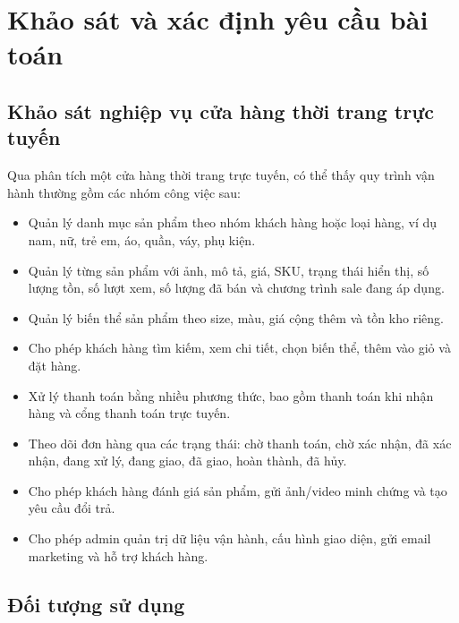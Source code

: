 \documentclass[12pt,a4paper]{report}
\begin{document}
\section{Khảo sát và xác định yêu cầu bài toán}

\subsection{Khảo sát nghiệp vụ cửa hàng thời trang trực tuyến}

Qua phân tích một cửa hàng thời trang trực tuyến, có thể thấy quy trình vận hành thường gồm các nhóm công việc sau:

\begin{itemize}
    \item Quản lý danh mục sản phẩm theo nhóm khách hàng hoặc loại hàng, ví dụ nam, nữ, trẻ em, áo, quần, váy, phụ kiện.
    \item Quản lý từng sản phẩm với ảnh, mô tả, giá, SKU, trạng thái hiển thị, số lượng tồn, số lượt xem, số lượng đã bán và chương trình sale đang áp dụng.
    \item Quản lý biến thể sản phẩm theo size, màu, giá cộng thêm và tồn kho riêng.
    \item Cho phép khách hàng tìm kiếm, xem chi tiết, chọn biến thể, thêm vào giỏ và đặt hàng.
    \item Xử lý thanh toán bằng nhiều phương thức, bao gồm thanh toán khi nhận hàng và cổng thanh toán trực tuyến.
    \item Theo dõi đơn hàng qua các trạng thái: chờ thanh toán, chờ xác nhận, đã xác nhận, đang xử lý, đang giao, đã giao, hoàn thành, đã hủy.
    \item Cho phép khách hàng đánh giá sản phẩm, gửi ảnh/video minh chứng và tạo yêu cầu đổi trả.
    \item Cho phép admin quản trị dữ liệu vận hành, cấu hình giao diện, gửi email marketing và hỗ trợ khách hàng.
\end{itemize}

\subsection{Đối tượng sử dụng}
\end{document}
